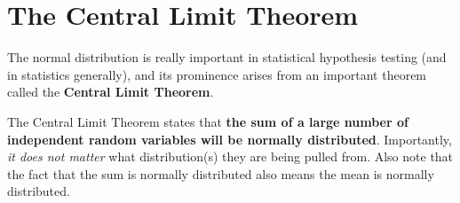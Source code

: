 
\section{The Central Limit Theorem}

The normal distribution is really important in statistical hypothesis testing (and in statistics generally), and its prominence arises from an important theorem called the \textbf{Central Limit Theorem}. 

The Central Limit Theorem states that \textbf{the sum of a large number of independent random variables will be normally distributed}. Importantly, \emph{it does not matter} what distribution(s) they are being pulled from. Also note that the fact that the sum is normally distributed also means the mean is normally distributed.

